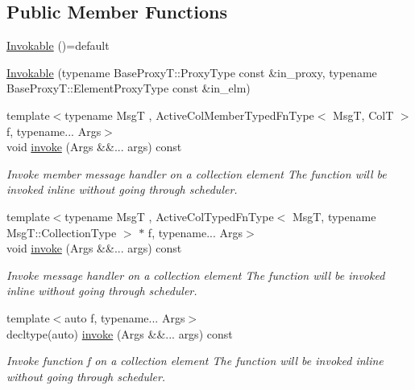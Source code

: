 \subsection*{Public Member Functions}
\begin{DoxyCompactItemize}
\item 
\hyperlink{structvt_1_1vrt_1_1collection_1_1_invokable_a6e64beec04b07f74b75ff37d088df3fe}{Invokable} ()=default
\item 
\hyperlink{structvt_1_1vrt_1_1collection_1_1_invokable_ac560937c6424cfb4471ba165914f0702}{Invokable} (typename Base\+Proxy\+T\+::\+Proxy\+Type const \&in\+\_\+proxy, typename Base\+Proxy\+T\+::\+Element\+Proxy\+Type const \&in\+\_\+elm)
\item 
{\footnotesize template$<$typename MsgT , Active\+Col\+Member\+Typed\+Fn\+Type$<$ Msg\+T, Col\+T $>$ f, typename... Args$>$ }\\void \hyperlink{structvt_1_1vrt_1_1collection_1_1_invokable_ab7ad9b74cbf75b0f1df13e0cc88311b7}{invoke} (Args \&\&... args) const
\begin{DoxyCompactList}\small\item\em Invoke member message handler on a collection element The function will be invoked inline without going through scheduler. \end{DoxyCompactList}\item 
{\footnotesize template$<$typename MsgT , Active\+Col\+Typed\+Fn\+Type$<$ Msg\+T, typename Msg\+T\+::\+Collection\+Type $>$ $\ast$ f, typename... Args$>$ }\\void \hyperlink{structvt_1_1vrt_1_1collection_1_1_invokable_ab7ad9b74cbf75b0f1df13e0cc88311b7}{invoke} (Args \&\&... args) const
\begin{DoxyCompactList}\small\item\em Invoke message handler on a collection element The function will be invoked inline without going through scheduler. \end{DoxyCompactList}\item 
{\footnotesize template$<$auto f, typename... Args$>$ }\\decltype(auto) \hyperlink{structvt_1_1vrt_1_1collection_1_1_invokable_a85b1cb97ede1b0652d4d994168fb0ede}{invoke} (Args \&\&... args) const
\begin{DoxyCompactList}\small\item\em Invoke function \textquotesingle{}f\textquotesingle{} on a collection element The function will be invoked inline without going through scheduler. \end{DoxyCompactList}\end{DoxyCompactItemize}


